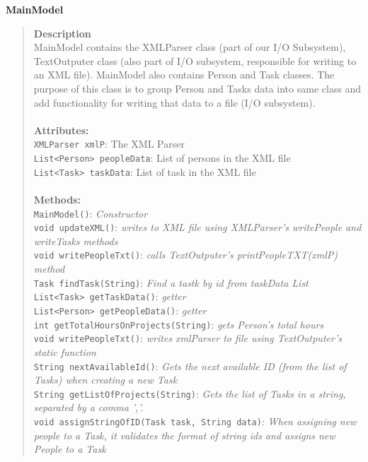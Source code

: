 \documentclass[12pt]{article}
\begin{document}
{\bf MainModel}
\begin{quote}
{\bf Description}\\
MainModel contains the XMLParser class (part of our I/O Subsystem), TextOutputer class (also part of I/O subsystem, responsible for writing to an XML file). MainModel also contains Person and Task classes. The purpose of this class is to group Person and Tasks data into same class and add functionality for writing that data to a file (I/O subsystem).\\\\
{\bf Attributes:}\\
\texttt{XMLParser xmlP}: The XML Parser\\
\texttt{List<Person> peopleData}: List of persons in the XML file\\
\texttt{List<Task> taskData}: List of task in the XML file\\\\
{\bf Methods:}\\
\texttt{MainModel()}: \emph{Constructor}\\
\texttt{void updateXML()}: \emph{writes to XML file using XMLParser's writePeople and writeTasks methods}\\
\texttt{void writePeopleTxt()}: \emph{calls TextOutputer's printPeopleTXT(xmlP) method}\\
\texttt{Task findTask(String)}: \emph{Find a tastk by id from taskData List}\\
\texttt{List<Task> getTaskData()}: \emph{getter}\\
\texttt{List<Person> getPeopleData()}: \emph{getter}\\
\texttt{int getTotalHoursOnProjects(String)}: \emph{gets Person's total hours}\\
\texttt{void writePeopleTxt()}: \emph{writes xmlParser to file using TextOutputer's static function}\\
\texttt{String nextAvailableId()}: \emph{Gets the next available ID (from the list of Tasks) when creating a new Task}\\
\texttt{String getListOfProjects(String)}: \emph{Gets the list of Tasks in a string, separated by a comma ','.}\\
\texttt{void assignStringOfID(Task task, String data)}: \emph{When assigning new people to a Task, it validates the format of string ids and assigns new People to a Task}
\end{quote}
 
\end{document}
